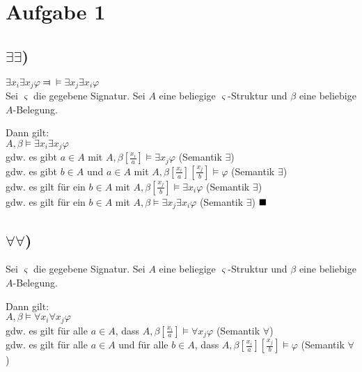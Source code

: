 \section*{Aufgabe 1}

\subsection*{$\exists \exists$)}

$\exists x_i \exists x_j \varphi \Dashv \vDash \exists x_j \exists x_i \varphi$\\

Sei $\varsigma$ die gegebene Signatur. Sei $A$ eine beliegige $\varsigma$-Struktur und $\beta$ eine beliebige $A$-Belegung.

Dann gilt:\\

$A,\beta \vDash \exists x_i \exists x_j \varphi$ \\

gdw. es gibt $a\in A$ mit $A,\beta [\frac{x_i}{a}]\vDash \exists x_j \varphi$ (Semantik $\exists $)\\

gdw. es gibt $b\in A$ und $a\in A$ mit $A,\beta [\frac{x_i}{a}][\frac{x_j}{b}]\vDash \varphi$ (Semantik $\exists$)\\

gdw. es gilt für ein $b\in A$ mit $A,\beta [\frac{x_j}{b}]\vDash \exists x_i \varphi$ (Semantik $\exists$)\\

gdw. es gilt für ein $b\in A$ mit $A,\beta \vDash \exists x_j \exists x_i \varphi$ (Semantik $\exists$) $\\\blacksquare$

\subsection*{$\forall \forall$)}
Sei $\varsigma$ die gegebene Signatur. Sei $A$ eine beliegige $\varsigma$-Struktur und $\beta$ eine beliebige $A$-Belegung.

Dann gilt:\\

$A,\beta \vDash \forall x_i \forall x_j \varphi$\\ 

gdw. es gilt für alle $a\in A$, dass $A,\beta[\frac{x_i}{a}] \vDash \forall x_j \varphi$ (Semantik $\forall$)\\

gdw. es gilt für alle $a\in A$ und für alle $b \in A$, dass $A,\beta[\frac{x_i}{a}][\frac{x_j}{b}] \vDash \varphi$ (Semantik $\forall$)\\

